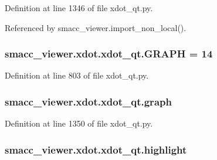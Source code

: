 Definition at line 1346 of file xdot\+\_\+qt.\+py.



Referenced by smacc\+\_\+viewer.\+import\+\_\+non\+\_\+local().

\subsubsection[{\texorpdfstring{G\+R\+A\+PH}{GRAPH}}]{ smacc\+\_\+viewer.\+xdot.\+xdot\+\_\+qt.\+G\+R\+A\+PH = 14}\hypertarget{namespacesmacc__viewer_1_1xdot_1_1xdot__qt_a33cc1b110ff8e2a7fe260d915fbaf6d0}{}\label{namespacesmacc__viewer_1_1xdot_1_1xdot__qt_a33cc1b110ff8e2a7fe260d915fbaf6d0}


Definition at line 803 of file xdot\+\_\+qt.\+py.

\subsubsection[{\texorpdfstring{graph}{graph}}]{\setlength{\rightskip}{0pt plus 5cm}smacc\+\_\+viewer.\+xdot.\+xdot\+\_\+qt.\+graph}\hypertarget{namespacesmacc__viewer_1_1xdot_1_1xdot__qt_a2319e52251767671674a2eedcf664b29}{}\label{namespacesmacc__viewer_1_1xdot_1_1xdot__qt_a2319e52251767671674a2eedcf664b29}


Definition at line 1350 of file xdot\+\_\+qt.\+py.

\subsubsection[{\texorpdfstring{highlight}{highlight}}]{\setlength{\rightskip}{0pt plus 5cm}smacc\+\_\+viewer.\+xdot.\+xdot\+\_\+qt.\+highlight}\hypertarget{namespacesmacc__viewer_1_1xdot_1_1xdot__qt_ab7970f10809cac5c23ebf9c6badb6d79}{}\label{namespacesmacc__viewer_1_1xdot_1_1xdot__qt_ab7970f10809cac5c23ebf9c6badb6d79}


